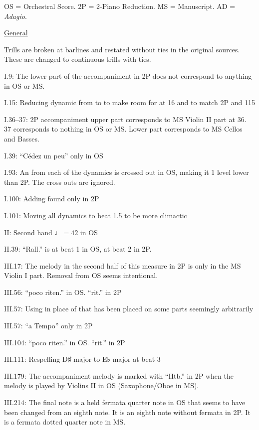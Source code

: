 \documentclass[twoside]{article}
\newcommand\dynmark[1]{\scalebox{0.9}{#1}{\kern1pt}}
\begin{document}
\begin{hangparas}{15pt}{1}
\bigbreak
OS = Orchestral Score. 2P = 2-Piano Reduction. MS = Manuscript. AD = \textit{Adagio}.
\begin{multicols}{2}

\underline{General}

Trills are broken at barlines and restated without ties in the original sources. These are changed to continuous trills with ties.

I.9: The lower part of the accompaniment in 2P does not correspond to anything in OS or MS.

I.15: Reducing dynamic from \dynmark{\p} to \dynmark{\pp} to make room for \dynmark{p} at 16 and to match 2P and 115

I.36--37: 2P accompaniment upper part corresponds to MS Violin II part at 36. 37 corresponds to nothing in OS or MS. Lower part corresponds to MS Cellos and Basses.

I.39: ``Cédez un peu'' only in OS

I.93: An \dynmark{\f} from each of the dynamics is crossed out in OS, making it 1 level lower than 2P. The cross outs are ignored.

I.100: Adding \dynmark{\fff} found only in 2P

I.101: Moving all dynamics to beat 1.5 to be more climactic

II: Second hand $\quarternote=42$ in OS

II.39: ``Rall.'' is at beat 1 in OS, at beat 2 in 2P.

III.17: The melody in the second half of this measure in 2P is only in the MS Violin I part. Removal from OS seems intentional.

III.56: ``poco riten.'' in OS. ``rit.'' in 2P

III.57: Using \dynmark{(\p)} in place of \dynmark{\p} that has been placed on some parts seemingly arbitrarily

III.57: ``a Tempo'' only in 2P

III.104: ``poco riten.'' in OS. ``rit.'' in 2P

III.111: Respelling D♯ major to E♭ major at beat 3

III.179: The accompaniment melody is marked with ``Htb.'' in 2P when the melody is played by Violins II in OS (Saxophone/Oboe in MS).

III.214: The final note is a held fermata quarter note in OS that seems to have been changed from an eighth note. It is an eighth note without fermata in 2P. It is a fermata dotted quarter note in MS.


\end{multicols}
\end{hangparas}
\end{document}
